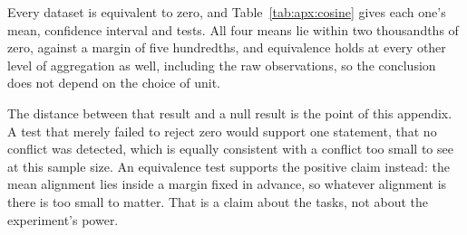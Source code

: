 

Every dataset is equivalent to zero, and Table~\ref{tab:apx:cosine} gives each one's mean, confidence
interval and tests. All four means lie within two thousandths of zero, against a margin of
five hundredths, and equivalence holds at every other level of aggregation as well, including the raw
observations, so the conclusion does not depend on the choice of unit.

The distance between that result and a null result is the point of this appendix. %
A test that merely
failed to reject zero would support one statement, that no conflict was detected, which is equally
consistent with a conflict too small to see at this sample size. An equivalence test supports the
positive claim instead: the mean alignment lies inside a margin fixed in advance, so whatever
alignment is there is too small to matter. That is a claim about the tasks, not about the
experiment's power.

